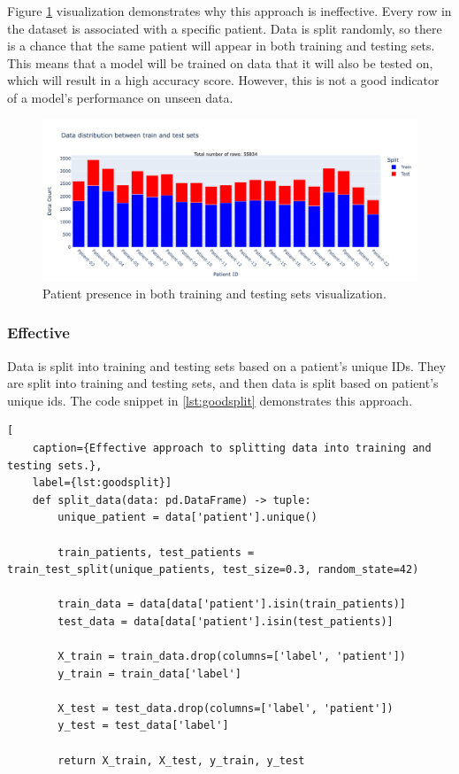                     Figure \ref{fig:badsplit} visualization demonstrates why this approach is ineffective. Every row in the dataset is associated with a specific patient. Data is split randomly, so there is a chance that the same patient will appear in both training and testing sets. This means that a model will be trained on data that it will also be tested on, which will result in a high accuracy score. However, this is not a good indicator of a model's performance on unseen data.

                    \begin{figure}[H]
                        \centering
                        \includegraphics[width=1.0\textwidth]{../src/resources/plots/splits/bad.png}
                        \caption{
                            Patient presence in both training and testing sets visualization.
                        }
                        \label{fig:badsplit}
                    \end{figure}
        
                    \newpage

            \subsubsection{Effective} \label{sec:goodsplit}
            Data is split into training and testing sets based on a patient's unique IDs. They are split into training and testing sets, and then data is split based on patient's unique ids. The code snippet in \ref{lst:goodsplit} demonstrates this approach.

\begin{lstlisting}[
    caption={Effective approach to splitting data into training and testing sets.}, 
    label={lst:goodsplit}]
    def split_data(data: pd.DataFrame) -> tuple:    
        unique_patient = data['patient'].unique()

        train_patients, test_patients = train_test_split(unique_patients, test_size=0.3, random_state=42)

        train_data = data[data['patient'].isin(train_patients)]
        test_data = data[data['patient'].isin(test_patients)] 

        X_train = train_data.drop(columns=['label', 'patient'])
        y_train = train_data['label']

        X_test = test_data.drop(columns=['label', 'patient'])
        y_test = test_data['label']
        
        return X_train, X_test, y_train, y_test
\end{lstlisting}

